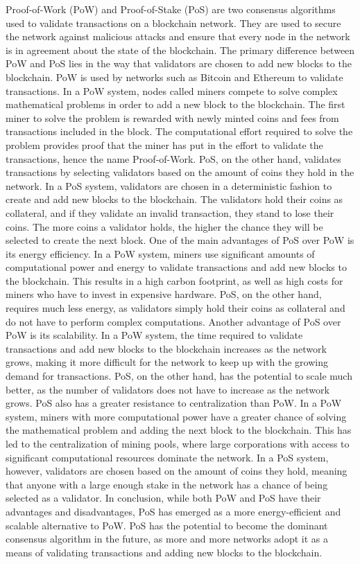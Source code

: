 \documentclass[target=mst,aauheader=]{thud}
\begin{document}
    Proof-of-Work (PoW) and Proof-of-Stake (PoS) are two consensus algorithms used to validate transactions on a blockchain network. They are used to secure the network against malicious attacks and ensure that every node in the network is in agreement about the state of the blockchain. The primary difference between PoW and PoS lies in the way that validators are chosen to add new blocks to the blockchain.
    PoW is used by networks such as Bitcoin and Ethereum to validate transactions. In a PoW system, nodes called miners compete to solve complex mathematical problems in order to add a new block to the blockchain. The first miner to solve the problem is rewarded with newly minted coins and fees from transactions included in the block. The computational effort required to solve the problem provides proof that the miner has put in the effort to validate the transactions, hence the name Proof-of-Work.
    PoS, on the other hand, validates transactions by selecting validators based on the amount of coins they hold in the network. In a PoS system, validators are chosen in a deterministic fashion to create and add new blocks to the blockchain. The validators hold their coins as collateral, and if they validate an invalid transaction, they stand to lose their coins. The more coins a validator holds, the higher the chance they will be selected to create the next block.
    One of the main advantages of PoS over PoW is its energy efficiency. In a PoW system, miners use significant amounts of computational power and energy to validate transactions and add new blocks to the blockchain. This results in a high carbon footprint, as well as high costs for miners who have to invest in expensive hardware\cite{zochowski2019proof}. PoS, on the other hand, requires much less energy, as validators simply hold their coins as collateral and do not have to perform complex computations.
    Another advantage of PoS over PoW is its scalability. In a PoW system, the time required to validate transactions and add new blocks to the blockchain increases as the network grows, making it more difficult for the network to keep up with the growing demand for transactions. PoS, on the other hand, has the potential to scale much better, as the number of validators does not have to increase as the network grows.
    PoS also has a greater resistance to centralization than PoW. In a PoW system, miners with more computational power have a greater chance of solving the mathematical problem and adding the next block to the blockchain. This has led to the centralization of mining pools, where large corporations with access to significant computational resources dominate the network. In a PoS system, however, validators are chosen based on the amount of coins they hold, meaning that anyone with a large enough stake in the network has a chance of being selected as a validator.
    In conclusion, while both PoW and PoS have their advantages and disadvantages, PoS has emerged as a more energy-efficient and scalable alternative to PoW. PoS has the potential to become the dominant consensus algorithm in the future, as more and more networks adopt it as a means of validating transactions and adding new blocks to the blockchain.    
\end{document}
